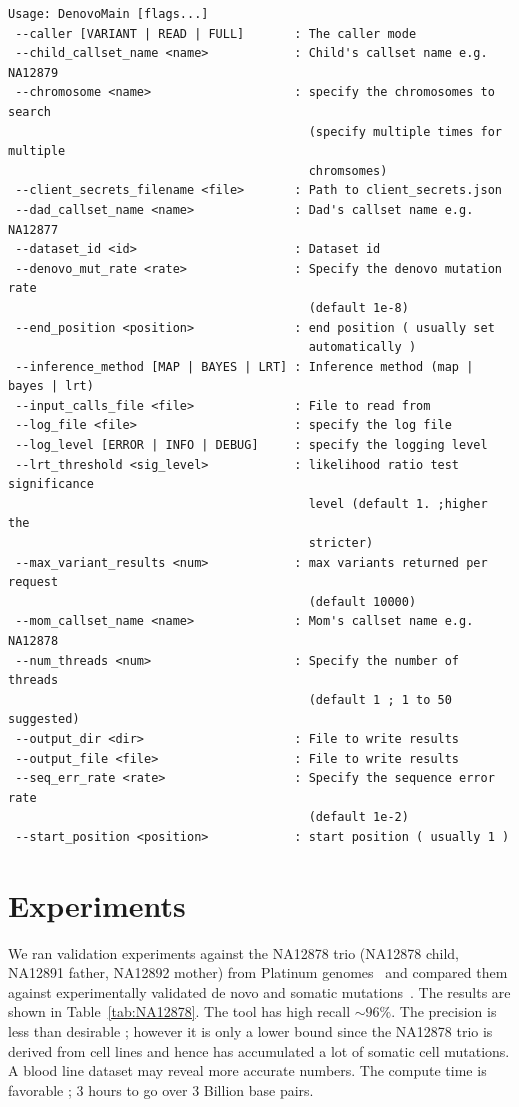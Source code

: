 \documentclass{article}
\begin{document}
\begin{verbatim}
Usage: DenovoMain [flags...]
 --caller [VARIANT | READ | FULL]       : The caller mode
 --child_callset_name <name>            : Child's callset name e.g. NA12879
 --chromosome <name>                    : specify the chromosomes to search
                                          (specify multiple times for multiple
                                          chromsomes)
 --client_secrets_filename <file>       : Path to client_secrets.json
 --dad_callset_name <name>              : Dad's callset name e.g. NA12877
 --dataset_id <id>                      : Dataset id
 --denovo_mut_rate <rate>               : Specify the denovo mutation rate
                                          (default 1e-8)
 --end_position <position>              : end position ( usually set
                                          automatically )
 --inference_method [MAP | BAYES | LRT] : Inference method (map | bayes | lrt)
 --input_calls_file <file>              : File to read from
 --log_file <file>                      : specify the log file
 --log_level [ERROR | INFO | DEBUG]     : specify the logging level
 --lrt_threshold <sig_level>            : likelihood ratio test significance
                                          level (default 1. ;higher the
                                          stricter)
 --max_variant_results <num>            : max variants returned per request
                                          (default 10000)
 --mom_callset_name <name>              : Mom's callset name e.g. NA12878
 --num_threads <num>                    : Specify the number of threads
                                          (default 1 ; 1 to 50 suggested)
 --output_dir <dir>                     : File to write results
 --output_file <file>                   : File to write results
 --seq_err_rate <rate>                  : Specify the sequence error rate
                                          (default 1e-2)
 --start_position <position>            : start position ( usually 1 )
\end{verbatim}


\section{Experiments}
\label{experiments}
We ran validation experiments against the NA12878 trio (NA12878 child, NA12891 father, NA12892 mother) from Platinum genomes~\cite{platinum} and compared them against experimentally validated de novo and somatic mutations~\cite{Conrad2011}. The results are shown in Table~\ref{tab:NA12878}. The tool has high recall $\sim 96\%$. The precision is less than desirable ; however it is only a lower bound since the NA12878 trio is derived from cell lines and hence has accumulated a lot of somatic cell mutations. A blood line dataset may reveal more accurate numbers. The compute time is favorable ; 3 hours to go over 3 Billion base pairs. 
\end{document}
